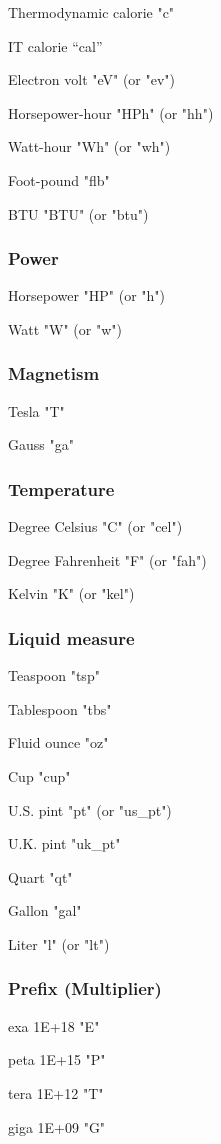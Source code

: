 Thermodynamic calorie "c" 

IT calorie "`cal"'

Electron volt "eV" (or "ev") 

Horsepower-hour "HPh" (or "hh") 

Watt-hour "Wh" (or "wh") 

Foot-pound "flb" 

BTU "BTU" (or "btu") 


\subsubsection{Power}
Horsepower "HP" (or "h") 

Watt "W" (or "w") 


\subsubsection{Magnetism}
Tesla "T" 

Gauss "ga" 


\subsubsection{Temperature}
Degree Celsius "C" (or "cel") 

Degree Fahrenheit "F" (or "fah") 

Kelvin "K" (or "kel") 


\subsubsection{Liquid measure}
Teaspoon "tsp" 

Tablespoon "tbs" 

Fluid ounce "oz" 

Cup "cup" 

U.S. pint "pt" (or "us\_pt") 

U.K. pint "uk\_pt" 

Quart "qt" 

Gallon "gal" 

Liter "l" (or "lt") 


\subsubsection{Prefix (Multiplier)}
exa 1E+18 "E" 

peta 1E+15 "P" 

tera 1E+12 "T" 

giga 1E+09 "G" 

